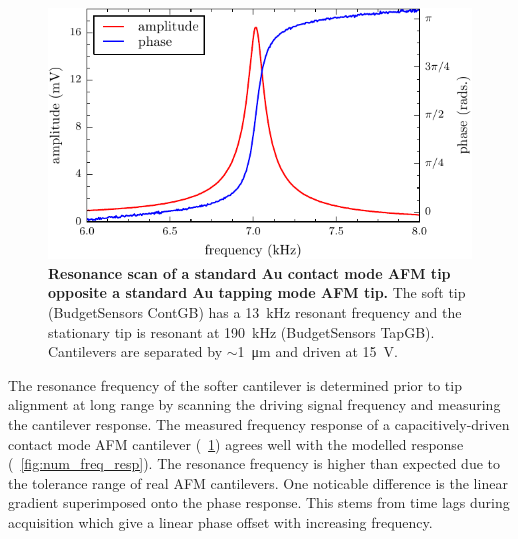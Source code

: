 \documentclass{article}
\begin{document}
\begin{figure}[bt]
\centering
\includegraphics{figures/exp_resonance_scan}
\caption[Resonance scan of a standard Au contact mode AFM tip opposite a standard Au tapping mode AFM tip]{\textbf{Resonance scan of a standard Au contact mode AFM tip opposite a standard Au tapping mode AFM tip.} The soft tip (BudgetSensors ContGB) has a \SI{13}{kHz} resonant frequency and the stationary tip is resonant at \SI{190}{kHz} (BudgetSensors TapGB). Cantilevers are separated by $\sim$\SI{1}{\micro\metre} and driven at \SI{15}{V}.}
\label{fig:exp_freq_resp}
\end{figure}

The resonance frequency of the softer cantilever is determined prior to tip alignment at long range by scanning the driving signal frequency and measuring the cantilever response. The measured frequency response of a capacitively-driven contact mode AFM cantilever (\figurename~\ref{fig:exp_freq_resp}) agrees well with the modelled response (\figurename~\ref{fig:num_freq_resp}). The resonance frequency is higher than expected due to the tolerance range of real AFM cantilevers. One noticable difference is the linear gradient superimposed onto the phase response. This stems from time lags during acquisition which give a linear phase offset with increasing frequency. %
\end{document}
